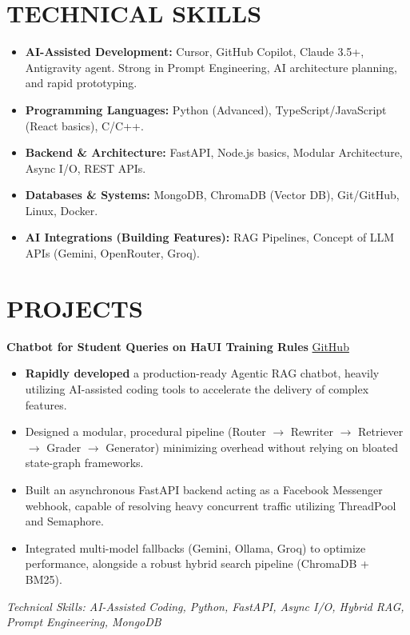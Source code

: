 \documentclass[10pt, a4paper]{article}
\begin{document}
\section*{TECHNICAL SKILLS}
\begin{itemize}[leftmargin=*, nosep]
    \item \textbf{AI-Assisted Development:} Cursor, GitHub Copilot, Claude 3.5+, Antigravity agent. Strong in Prompt Engineering, AI architecture planning, and rapid prototyping.
    \item \textbf{Programming Languages:} Python (Advanced), TypeScript/JavaScript (React basics), C/C++.
    \item \textbf{Backend \& Architecture:} FastAPI, Node.js basics, Modular Architecture, Async I/O, REST APIs.
    \item \textbf{Databases \& Systems:} MongoDB, ChromaDB (Vector DB), Git/GitHub, Linux, Docker.
    \item \textbf{AI Integrations (Building Features):} RAG Pipelines, Concept of LLM APIs (Gemini, OpenRouter, Groq).
\end{itemize}

\section*{PROJECTS}
\noindent\textbf{Chatbot for Student Queries on HaUI Training Rules} \hfill \href{https://github.com/CuongLam1206/Chatbox_Haui}{GitHub}
\begin{itemize}[leftmargin=1.5em, itemsep=0pt]
    \item \textbf{Rapidly developed} a production-ready Agentic RAG chatbot, heavily utilizing AI-assisted coding tools to accelerate the delivery of complex features.
    \item Designed a modular, procedural pipeline (Router $\to$ Rewriter $\to$ Retriever $\to$ Grader $\to$ Generator) minimizing overhead without relying on bloated state-graph frameworks.
    \item Built an asynchronous FastAPI backend acting as a Facebook Messenger webhook, capable of resolving heavy concurrent traffic utilizing ThreadPool and Semaphore.
    \item Integrated multi-model fallbacks (Gemini, Ollama, Groq) to optimize performance, alongside a robust hybrid search pipeline (ChromaDB + BM25).
\end{itemize}
\emph{Technical Skills: AI-Assisted Coding, Python, FastAPI, Async I/O, Hybrid RAG, Prompt Engineering, MongoDB}
\end{document}
